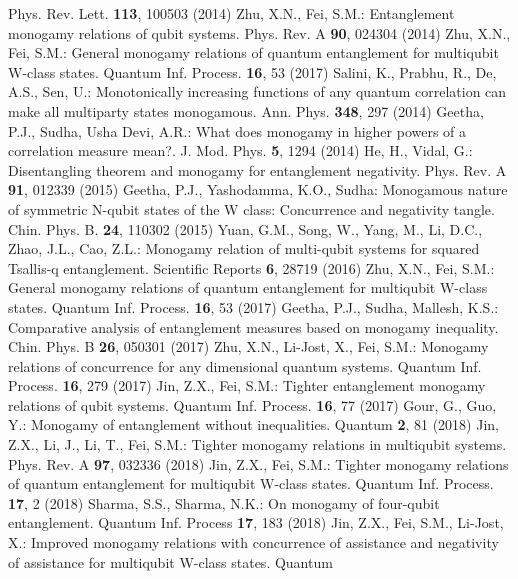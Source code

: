 \documentclass[pra,a4paper,showpacs,superscriptaddress]{revtex4}
\begin{document}
\begin{thebibliography}{50}
Phys. Rev. 
Lett. {\bf 113}, 100503 (2014)
 Zhu, X.N., Fei, S.M.: Entanglement monogamy 
relations of qubit systems. Phys. Rev. A {\bf 
90}, 024304 (2014)
  Zhu, X.N., Fei, S.M.: General monogamy relations of 
quantum entanglement
for multiqubit W-class states. Quantum Inf. 
Process. {\bf 16}, 53 (2017)
  Salini, K., Prabhu, R., De, A.S., Sen, U.: 
 Monotonically increasing functions of any quantum correlation can
 make all multiparty states monogamous.
 Ann. Phys. {\bf 348}, 297 (2014)
 Geetha, P.J., Sudha, Usha Devi, A.R.: What does 
monogamy in higher powers of a correlation measure mean?. J. Mod. 
Phys. {\bf 5}, 1294 (2014)
 He, H., Vidal, G.: Disentangling theorem and 
monogamy for entanglement negativity. Phys. Rev. A {\bf 91}, 
012339 (2015)
 Geetha, P.J., Yashodamma, K.O., Sudha: Monogamous 
nature of symmetric N-qubit states of
the W class: Concurrence and negativity tangle. Chin. 
Phys. B. {\bf 24}, 110302 (2015)
 Yuan, G.M., Song, W., Yang, M., Li, D.C., Zhao, 
J.L., Cao, Z.L.: Monogamy relation of multi-qubit
systems for squared Tsallis-q
entanglement. Scientific 
Reports {\bf 6}, 28719 (2016)
 Zhu, X.N., Fei, S.M.: General monogamy relations 
of quantum entanglement
for multiqubit W-class states. Quantum 
Inf. Process. {\bf 16}, 53 (2017)
 Geetha, P.J., Sudha, Mallesh, K.S.: Comparative 
analysis of entanglement measures
based on monogamy inequality. Chin. 
Phys. B {\bf 26}, 050301 (2017)
 Zhu, X.N., Li-Jost, X., Fei, S.M.: Monogamy relations 
of concurrence for any
dimensional quantum systems.
 Quantum Inf. Process.
{\bf 16}, 279 (2017)
 Jin, Z.X., Fei, S.M.: Tighter entanglement monogamy 
relations of qubit
systems. Quantum 
Inf. Process. {\bf 16}, 77 (2017)
 Gour, G., Guo, Y.: Monogamy of entanglement without 
inequalities. Quantum {\bf 2}, 81 (2018)
 Jin, Z.X., Li, J., Li, T., Fei, S.M.: Tighter 
monogamy relations in multiqubit systems.  Phys. Rev. A {\bf 97}, 
032336 (2018) 
  Jin, Z.X., Fei, S.M.: Tighter monogamy relations of 
quantum entanglement
for multiqubit W-class states. Quantum Inf. 
Process. {\bf 17}, 2 (2018)
  Sharma, S.S., Sharma, N.K.: On monogamy of four-qubit 
entanglement. Quantum Inf. 
Process {\bf 17}, 183 (2018)
 Jin, Z.X., Fei, S.M., Li-Jost, X.: Improved 
monogamy relations with concurrence of
assistance and negativity of assistance for multiqubit
W-class states. Quantum 

\end{thebibliography}
\end{document}
